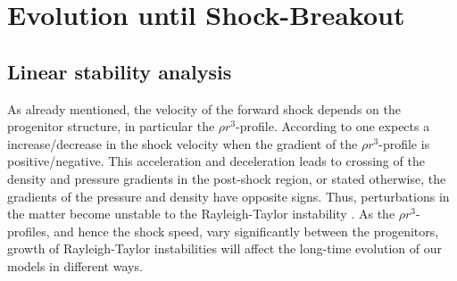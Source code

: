 \documentclass[fleqn,usenatbib]{mnras}
\newcommand{\GEO}[1]{{\color{red}#1}}
\begin{document}
\section{Evolution until Shock-Breakout}
\label{sec:Evolution until Shock-Breakout}
\subsection{Linear stability analysis}
\label{sec:Linear stability analysis}
As already mentioned, the velocity of the forward shock depends on the progenitor structure, in particular the $\rho r^3$-profile. According to \cite{Sedov1961} one expects a \GEO{increase/decrease} in the shock velocity when the gradient of the $\rho r^3$-profile is positive/negative. 
\GEO{This acceleration and deceleration leads to crossing of the density and pressure gradients in the post-shock region, or stated otherwise, the gradients of the pressure and density have opposite signs.} Thus, perturbations in the matter become unstable to the Rayleigh-Taylor instability \citep{Rayleigh1882,Chevalier1978}. As the $\rho r^3 $-profiles, and hence the shock speed, vary significantly between the progenitors, growth of Rayleigh-Taylor instabilities will affect the long-time evolution of our models in different ways.
\end{document}
